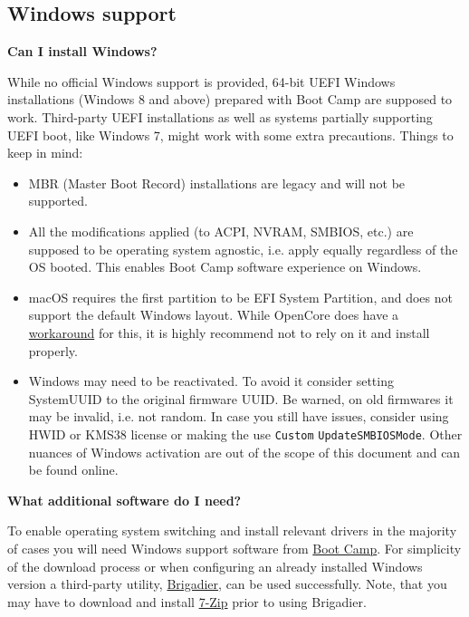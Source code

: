 \documentclass[]{article}
\begin{document}
\subsection{Windows support}\label{troubleshootingwin}

  \textbf{Can I install Windows?}

  While no official Windows support is provided, 64-bit UEFI Windows installations (Windows 8 and
  above) prepared with Boot Camp are supposed to work. Third-party UEFI installations
  as well as systems partially supporting UEFI boot, like Windows 7, might work with
  some extra precautions. Things to keep in mind:

  \begin{itemize}
  \item MBR (Master Boot Record) installations are legacy and will not be supported.
  \item All the modifications applied (to ACPI, NVRAM, SMBIOS, etc.) are supposed
  to be operating system agnostic, i.e. apply equally regardless of the OS booted.
  This enables Boot Camp software experience on Windows.
  \item macOS requires the first partition to be EFI System Partition, and does
  not support the default Windows layout. While OpenCore does have a
  \href{https://github.com/acidanthera/bugtracker/issues/327}{workaround}
  for this, it is highly recommend not to rely on it and install properly.
  \item Windows may need to be reactivated. To avoid it consider
  setting SystemUUID to the original firmware UUID. Be warned,
  on old firmwares it may be invalid, i.e. not random. In case you still have issues,
  consider using HWID or KMS38 license or making the use \texttt{Custom}
  \texttt{UpdateSMBIOSMode}. Other nuances of Windows activation are out of the
  scope of this document and can be found online.
  \end{itemize}

  \textbf{What additional software do I need?}

  To enable operating system switching and install relevant drivers in the majority of
  cases you will need Windows support software from
  \href{https://support.apple.com/boot-camp}{Boot Camp}. For simplicity of the download
  process or when configuring an already installed Windows version a third-party utility,
  \href{https://github.com/timsutton/brigadier}{Brigadier}, can be used successfully.
  Note, that you may have to download and install \href{https://www.7-zip.org}{7-Zip}
  prior to using Brigadier.
\end{document}
